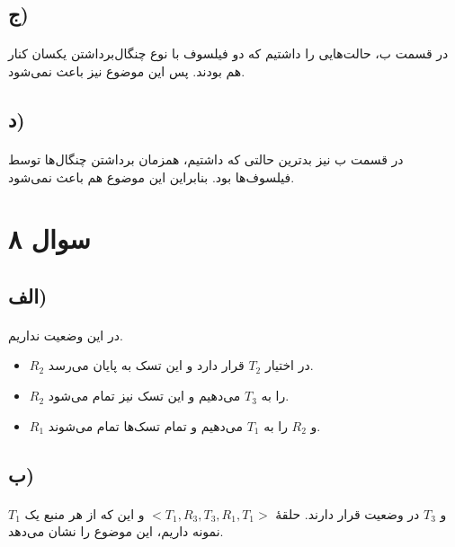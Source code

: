 \documentclass{article}
\begin{document}
	\subsection*{ج)}
	\paragraph*{}
	در قسمت ب، حالت‌هایی را داشتیم که دو فیلسوف با نوع چنگال‌برداشتن یکسان کنار هم بودند. پس این موضوع نیز باعث
	نمی‌شود.

	\subsection*{د)}
	\paragraph*{}
	در قسمت ب نیز بدترین حالتی که داشتیم، همزمان برداشتن چنگال‌ها توسط فیلسوف‌ها بود. بنابراین این موضوع هم باعث
	نمی‌شود.

	\section*{سوال ۸}
	\subsection*{الف)}
	\paragraph*{}
	در این وضعیت
	نداریم.

	\begin{itemize}
		\item
		$R_2$
		در اختیار
		$T_2$
		قرار دارد و این تسک به پایان می‌رسد.

		\item
		$R_2$
		را به
		$T_3$
		می‌دهیم و این تسک نیز تمام می‌شود.

		\item
		$R_1$
		و
		$R_2$
		را به
		$T_1$
		می‌دهیم و تمام تسک‌ها تمام می‌شوند.
	\end{itemize}

	\subsection*{ب)}
	\paragraph*{}
	$T_1$
	و
	$T_3$
	در وضعیت
	قرار دارند. حلقهٔ
	$<T_1, R_3, T_3, R_1, T_1>$
	و این که از هر منبع یک نمونه داریم، این موضوع را نشان می‌دهد.
\end{document}
